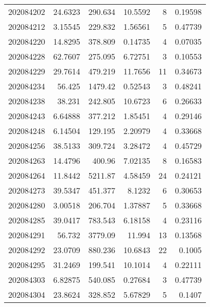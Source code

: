 \begin{tabular}{rrrrrr}
 202084202 &         24.6323  &      290.634  &           10.5592  &           8 & 0.19598 \\
 202084212 &          3.15545 &      229.832  &            1.56561 &           5 & 0.47739 \\
 202084220 &         14.8295  &      378.809  &            0.14735 &           4 & 0.07035 \\
 202084228 &         62.7607  &      275.095  &            6.72751 &           3 & 0.10553 \\
 202084229 &         29.7614  &      479.219  &           11.7656  &          11 & 0.34673 \\
 202084234 &         56.425   &     1479.42   &            0.52543 &           3 & 0.48241 \\
 202084238 &         38.231   &      242.805  &           10.6723  &           6 & 0.26633 \\
 202084243 &          6.64888 &      377.212  &            1.85451 &           4 & 0.29146 \\
 202084248 &          6.14504 &      129.195  &            2.20979 &           4 & 0.33668 \\
 202084256 &         38.5133  &      309.724  &            3.28472 &           4 & 0.45729 \\
 202084263 &         14.4796  &      400.96   &            7.02135 &           8 & 0.16583 \\
 202084264 &         11.8442  &     5211.87   &            4.58459 &          24 & 0.24121 \\
 202084273 &         39.5347  &      451.377  &            8.1232  &           6 & 0.30653 \\
 202084280 &          3.00518 &      206.704  &            1.37887 &           5 & 0.33668 \\
 202084285 &         39.0417  &      783.543  &            6.18158 &           4 & 0.23116 \\
 202084291 &         56.732   &     3779.09   &           11.994   &          13 & 0.13568 \\
 202084292 &         23.0709  &      880.236  &           10.6843  &          22 & 0.1005  \\
 202084295 &         31.2469  &      199.541  &           10.1014  &           4 & 0.22111 \\
 202084303 &          6.82875 &      540.085  &            0.27684 &           3 & 0.47739 \\
 202084304 &         23.8624  &      328.852  &            5.67829 &           5 & 0.1407  \\

\end{tabular}
